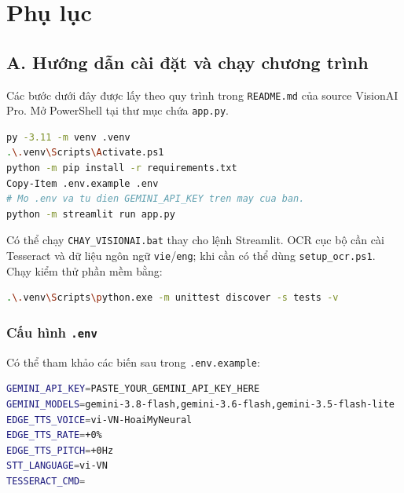 \chapter{Phụ lục}

\section*{A. Hướng dẫn cài đặt và chạy chương trình}
{}

Các bước dưới đây được lấy theo quy trình trong \texttt{README.md} của source
VisionAI Pro. Mở PowerShell tại thư mục chứa \texttt{app.py}.

\begin{lstlisting}[language=bash, caption={Tạo môi trường và chạy ứng dụng trên Windows.}]
py -3.11 -m venv .venv
.\.venv\Scripts\Activate.ps1
python -m pip install -r requirements.txt
Copy-Item .env.example .env
# Mo .env va tu dien GEMINI_API_KEY tren may cua ban.
python -m streamlit run app.py
\end{lstlisting}

Có thể chạy \texttt{CHAY\_VISIONAI.bat} thay cho lệnh Streamlit. OCR cục bộ
cần cài Tesseract và dữ liệu ngôn ngữ \texttt{vie}/\texttt{eng}; khi cần có
thể dùng \texttt{setup\_ocr.ps1}. Chạy kiểm thử phần mềm bằng:

\begin{lstlisting}[language=bash, caption={Chạy các kiểm thử cục bộ không cần gọi Gemini.}]
.\.venv\Scripts\python.exe -m unittest discover -s tests -v
\end{lstlisting}

\subsection*{Cấu hình \texttt{.env}}

Có thể tham khảo các biến sau trong \texttt{.env.example}:

\begin{lstlisting}[language=bash, caption={Các biến môi trường của hệ thống.}]
GEMINI_API_KEY=PASTE_YOUR_GEMINI_API_KEY_HERE
GEMINI_MODELS=gemini-3.8-flash,gemini-3.6-flash,gemini-3.5-flash-lite
EDGE_TTS_VOICE=vi-VN-HoaiMyNeural
EDGE_TTS_RATE=+0%
EDGE_TTS_PITCH=+0Hz
STT_LANGUAGE=vi-VN
TESSERACT_CMD=
\end{lstlisting}

